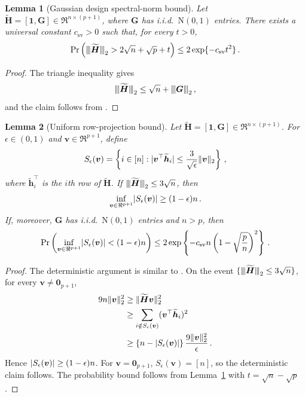 \documentclass{article}
\makeatletter
\newtheorem{lemma}{Lemma}
\theoremstyle{definition}
\newcommand{\vnorm}[1]{%
	\ensuremath{%
		\if@display
		\left\| #1 \right\|
		\else
		\| #1 \|
		\fi
	}%
}
\newcommand{\abs}[1]{%
	\ensuremath{%
		\if@display
		\left| #1 \right|
		\else
		\lvert #1 \rvert
		\fi
	}%
}
\newcommand{\mnorm}[1]{{\left\vert\kern-0.25ex\left\vert\kern-0.25ex\left\vert #1
		\right\vert\kern-0.25ex\right\vert\kern-0.25ex\right\vert}}
\newcommand{\mnorms}[1]{{\vert\kern-0.25ex\vert\kern-0.25ex\vert #1
		\vert\kern-0.25ex\vert\kern-0.25ex\vert}}
\newcommand*{\bb}{\boldsymbol}
\def\bH {\bb{H}}
\def\bv{\bb{v}}
\def\bh{\bb{h}}
\def\bH{\bb{H}}
\makeatother
\begin{document}
\begin{bibunit}
\begin{lemma}[Gaussian design spectral-norm bound]
	\label{lemma:sv_ub}
	Let
	$
		\widetilde{\bH}
		=
		[\bb1,\bb G]
		\in
		\Re^{n\times(p+1)}
	$,
	where $\bb G$ has i.i.d.\ $\mathrm{N}(0,1)$ entries. There exists a
	universal constant $c_{\mathrm{sv}}>0$ such that, for every $t>0$,
	$$
		\Pr\left(
			\mnorms{\widetilde{\bH}}_2
			>
			2\sqrt n+\sqrt p+t
		\right)
		\leq
		2\exp\{-c_{\mathrm{sv}}t^2\}\,.
	$$
\end{lemma}

\begin{proof}
	The triangle inequality gives
	$$
		\mnorms{\widetilde{\bH}}_2
		\leq
		\sqrt n+\mnorm{\bb G}_2\,,
	$$
	and the claim follows from
	\citealt[][Corollary~7.3.3]{vershynin:2018}.
\end{proof}

\begin{lemma}[Uniform row-projection bound]
	\label{lemma:set_bound}
	Let
	$
		\widetilde{\bH}
		=
		[\bb1,\bb G]
		\in
		\Re^{n\times(p+1)}
	$.
	For $\epsilon\in(0,1)$ and $\bv\in\Re^{p+1}$, define
	$$
		S_\epsilon(\bv)
		=
		\left\{
			i\in[n]:
			\abs{\bv^\top\widetilde{\bh}_i}
			\leq
			\frac{3}{\sqrt\epsilon}\vnorm{\bv}_2
		\right\}\,,
	$$
	where $\widetilde{\bh}_i^\top$ is the $i$th row of
	$\widetilde{\bH}$. If
	$\mnorms{\widetilde{\bH}}_2\leq3\sqrt n$, then
	$$
		\underset{\bv\in\Re^{p+1}}{\inf}
		\abs{S_\epsilon(\bv)}
		\geq
		(1-\epsilon)n\,.
	$$
	If, moreover, $\bb G$ has i.i.d.\ $\mathrm{N}(0,1)$ entries and
	$n>p$, then
	$$
		\Pr\left(
			\underset{\bv\in\Re^{p+1}}{\inf}
			\abs{S_\epsilon(\bv)}
			<
			(1-\epsilon)n
		\right)
		\leq
		2\exp\left\{
			-c_{\mathrm{sv}}n
			\left(
				1-\sqrt{\frac pn}
			\right)^2
		\right\}\,.
	$$
\end{lemma}

\begin{proof}
    The deterministic argument is similar to
\citet[][Lemma~7]{sur:2019}.
	On the event
	$\{\mnorms{\widetilde{\bH}}_2\leq3\sqrt n\}$, for every
	$\bv\neq\bb0_{p+1}$,
	$$
	\begin{aligned}
		9n\vnorm{\bv}_2^2
		&\geq
		\vnorm{\widetilde{\bH}\bv}_2^2
		\\
		&\geq
		\sum_{i\notin S_\epsilon(\bv)}
		(\bv^\top\widetilde{\bh}_i)^2
		\\
		&\geq
		\left\{
			n-\abs{S_\epsilon(\bv)}
		\right\}
		\frac{9\vnorm{\bv}_2^2}{\epsilon}\,.
	\end{aligned}
	$$
	Hence
	$
		\abs{S_\epsilon(\bv)}
		\geq
		(1-\epsilon)n
	$.
	For $\bv=\bb0_{p+1}$,
	$
		S_\epsilon(\bv)=[n]
	$,
	so the deterministic claim follows. The probability bound follows from
	Lemma~\ref{lemma:sv_ub} with
	$
		t=\sqrt n-\sqrt p
	$.
\end{proof}



\end{bibunit}
\end{document}
